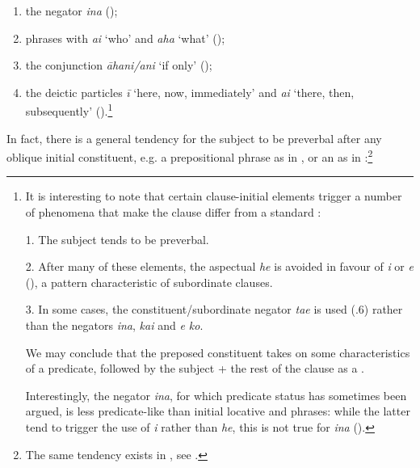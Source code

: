 \begin{enumerate}
\item 
the negator \textit{{\ꞌ}ina} ();

\item 
{} phrases with \textit{ai} ‘who’ and \textit{aha} ‘what’ ();

\item 
the conjunction \textit{{\ꞌ}āhani}\textit{/{\ꞌ}ani} ‘if only’ ();

\item 
the deictic particles \textit{{\ꞌ}ī} ‘here, now, immediately’ and \textit{{\ꞌ}ai} ‘there, then, subsequently’ ().\footnote{\label{fn:420}It is interesting to note that certain clause-initial elements trigger a number of phenomena that make the clause differ from a standard :

1. The subject tends to be preverbal.

2. After many of these elements, the aspectual \textit{he} is avoided in favour of \textit{i} or \textit{e} (), a pattern characteristic of subordinate clauses.

3. In some cases, the constituent/subordinate negator \textit{ta{\ꞌ}e} is used (.6) rather than the  negators \textit{{\ꞌ}ina}, \textit{kai} and \textit{e ko}.

We may conclude that the preposed constituent takes on some characteristics of a predicate, followed by the subject + the rest of the clause as a . 

Interestingly, the negator \textit{{\ꞌ}ina}, for which predicate status has sometimes been argued, is less predicate-like than initial locative and  phrases: while the latter tend to trigger the use of \textit{i} rather than \textit{he}, this is not true for \textit{{\ꞌ}ina} ().}

\end{enumerate}

In fact, there is a general tendency for the subject to be preverbal after any oblique initial constituent, e.g. a prepositional phrase as in , or an  as in :\footnote{\label{fn:421}The same tendency exists in , see \citet[96]{Harlow2007Subject}.}

